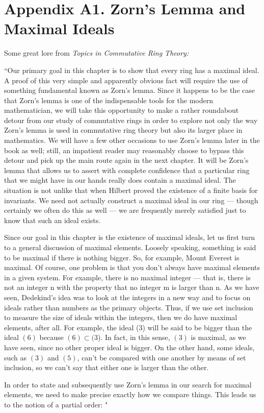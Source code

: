 \documentclass[12pt,reqno]{amsart}
\theoremstyle{plain}
\begin{document}
\section{Appendix A1. Zorn’s Lemma and Maximal Ideals}

Some great lore from \textit{Topics in Commutative Ring Theory:}

\begin{center}
``Our primary goal in this chapter is to show that every ring has a maximal ideal. A proof of this very simple and apparently obvious fact will require the use of something fundamental known as Zorn’s lemma. Since it happens to be the case that Zorn’s lemma is one of the indispensable tools for the modern mathematician, we will take this opportunity to make a rather roundabout detour from our study of commutative rings in order to explore not only the way Zorn’s lemma is used in commutative ring theory but also its larger place in mathematics. We will have a few other occasions to use Zorn’s lemma later in the book as well; still, an impatient reader may reasonably choose to bypass this detour and pick up the main route again in the next chapter.
It will be Zorn’s lemma that allows us to assert with complete confidence that a particular ring that we might have in our hands really does contain a maximal ideal. The situation is not unlike that when Hilbert proved the existence of a finite basis for invariants. We need not actually construct a maximal ideal in our ring — though certainly we often do this as well — we are frequently merely satisfied just to know that such an ideal exists.


Since our goal in this chapter is the existence of maximal ideals, let us first turn to a general discussion of maximal elements. Loosely speaking, something is said to be maximal if there is nothing bigger. So, for example, Mount Everest is maximal. Of course, one problem is that you don’t always have maximal elements in a given system. For example, there is no maximal integer — that is, there is not an integer n with the property that no integer m is larger than n. As we have seen, Dedekind’s idea was to look at the integers in a new way and to focus on ideals rather than numbers as the primary objects. Thus, if we use set inclusion to measure the size of ideals within the integers, then we do have maximal elements, after all. For example, the ideal (3) will be said to be bigger than the ideal $(6)$ because $(6) \subset (3$). In fact, in this sense, $(3)$ is maximal, as we have seen, since no other proper ideal is bigger. On the other hand, some ideals, such as $(3)$ and $(5)$, can’t be compared with one another by means of set inclusion, so we can’t say that either one is larger than the other.

In order to state and subsequently use Zorn’s lemma in our search for maximal elements, we need to make precise exactly how we compare things. This leads us to the notion of a partial order: "
\end{center}
\end{document}
